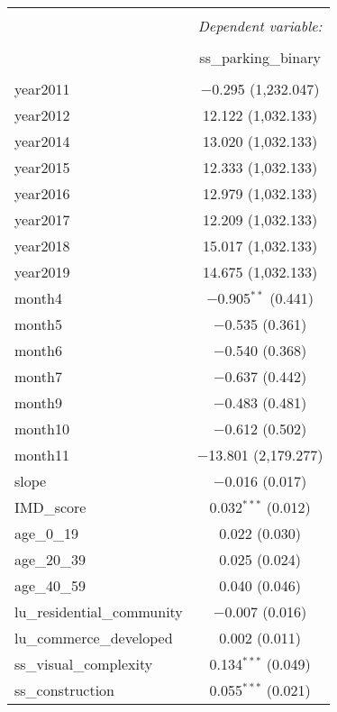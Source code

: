 \begin{table}[!htbp] \centering 
  \caption{} 
  \label{} 
\small 
\begin{tabular}{@{\extracolsep{1pt}}lc} 
\\[-1.8ex]\hline 
\hline \\[-1.8ex] 
 & \multicolumn{1}{c}{\textit{Dependent variable:}} \\ 
\cline{2-2} 
\\[-1.8ex] & ss\_parking\_binary \\ 
\hline \\[-1.8ex] 
 year2011 & $-$0.295 (1,232.047) \\ 
  year2012 & 12.122 (1,032.133) \\ 
  year2014 & 13.020 (1,032.133) \\ 
  year2015 & 12.333 (1,032.133) \\ 
  year2016 & 12.979 (1,032.133) \\ 
  year2017 & 12.209 (1,032.133) \\ 
  year2018 & 15.017 (1,032.133) \\ 
  year2019 & 14.675 (1,032.133) \\ 
  month4 & $-$0.905$^{**}$ (0.441) \\ 
  month5 & $-$0.535 (0.361) \\ 
  month6 & $-$0.540 (0.368) \\ 
  month7 & $-$0.637 (0.442) \\ 
  month9 & $-$0.483 (0.481) \\ 
  month10 & $-$0.612 (0.502) \\ 
  month11 & $-$13.801 (2,179.277) \\ 
  slope & $-$0.016 (0.017) \\ 
  IMD\_score & 0.032$^{***}$ (0.012) \\ 
  age\_0\_19 & 0.022 (0.030) \\ 
  age\_20\_39 & 0.025 (0.024) \\ 
  age\_40\_59 & 0.040 (0.046) \\ 
  lu\_residential\_community & $-$0.007 (0.016) \\ 
  lu\_commerce\_developed & 0.002 (0.011) \\ 
  ss\_visual\_complexity & 0.134$^{***}$ (0.049) \\ 
  ss\_construction & 0.055$^{***}$ (0.021) \\ 

\end{tabular}
\end{table}

